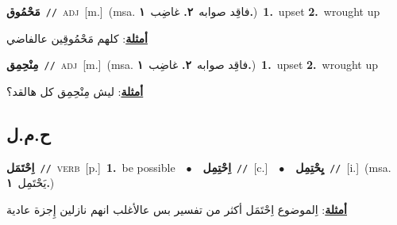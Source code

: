 \documentclass[10pt,a4paper,twoside]{article} %
\begin{document}
\begin{multicols}{2}
{\setlength\topsep{0pt}\textbf{\foreignlanguage{arabic}{مَحْمُوق}}\ {\color{gray}\texttt{//}\color{black}}\ \textsc{adj}\ [m.]\ \color{gray}(msa. \foreignlanguage{arabic}{فاقِد صوابه}~\foreignlanguage{arabic}{\textbf{٢.}}  \foreignlanguage{arabic}{غاضِب}~\foreignlanguage{arabic}{\textbf{١.}})\color{black}\ \textbf{1.}~upset  \textbf{2.}~wrought up\  \begin{flushright}\color{gray}\foreignlanguage{arabic}{\textbf{\underline{\foreignlanguage{arabic}{أمثلة}}}: كلهم مَحْمُوقِين عالفاضي}\end{flushright}\color{black}} \vspace{2mm}

{\setlength\topsep{0pt}\textbf{\foreignlanguage{arabic}{مِنْحِمِق}}\ {\color{gray}\texttt{//}\color{black}}\ \textsc{adj}\ [m.]\ \color{gray}(msa. \foreignlanguage{arabic}{فاقِد صوابه}~\foreignlanguage{arabic}{\textbf{٢.}}  \foreignlanguage{arabic}{غاضِب}~\foreignlanguage{arabic}{\textbf{١.}})\color{black}\ \textbf{1.}~upset  \textbf{2.}~wrought up\  \begin{flushright}\color{gray}\foreignlanguage{arabic}{\textbf{\underline{\foreignlanguage{arabic}{أمثلة}}}: ليش مِنْحِمِق كل هالقد؟}\end{flushright}\color{black}} \vspace{2mm}

\vspace{-3mm}
\subsection*{\color{blue}\foreignlanguage{arabic}{ح.م.ل}\color{blue}{}} 

{\setlength\topsep{0pt}\textbf{\foreignlanguage{arabic}{اِحْتَمَل}}\ {\color{gray}\texttt{//}\color{black}}\ \textsc{verb}\ [p.]\ \textbf{1.}~be possible\ \ $\bullet$\ \ \setlength\topsep{0pt}\textbf{\foreignlanguage{arabic}{اِحْتِمِل}}\ {\color{gray}\texttt{//}\color{black}}\ [c.]\ \ $\bullet$\ \ \setlength\topsep{0pt}\textbf{\foreignlanguage{arabic}{يِحْتِمِل}}\ {\color{gray}\texttt{//}\color{black}}\ [i.]\ \color{gray}(msa. \foreignlanguage{arabic}{يَحْتَمِل}~\foreignlanguage{arabic}{\textbf{١.}})\color{black}\  \begin{flushright}\color{gray}\foreignlanguage{arabic}{\textbf{\underline{\foreignlanguage{arabic}{أمثلة}}}: اِلموضوع اِحْتَمَل أكثر من تفسير بس عالأغلب انهم نازلين إِجزة عادية}\end{flushright}\color{black}} \vspace{2mm}


\end{multicols}
\end{document}
